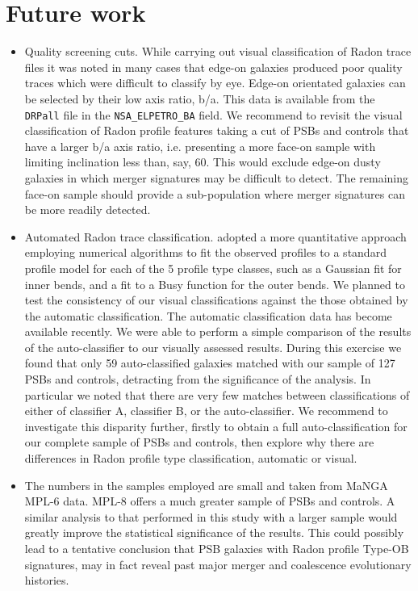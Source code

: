 \section{Future work}
\label{sec:future-work}

\begin{itemize}
    \item Quality screening cuts. While carrying out visual classification of Radon trace files it was noted in many cases that edge-on galaxies produced poor quality traces which were difficult to classify by eye. Edge-on orientated galaxies can be selected by their low axis ratio, b/a. This data is available from the \texttt{DRPall} file in the \texttt{NSA\_ELPETRO\_BA} field. We recommend to revisit the visual classification of Radon profile features taking a cut of PSBs and controls that have a larger b/a axis ratio, i.e. presenting a  more face-on sample with limiting inclination less than, say, 60\textdegree. This would exclude edge-on dusty galaxies in which merger signatures may be difficult to detect. The remaining face-on sample should provide a sub-population where merger signatures can be more readily detected.
    \item Automated Radon trace classification. \cite{2018MNRAS.480.2217S} adopted a more quantitative approach employing numerical algorithms to fit the observed profiles to a standard profile model for each of the 5 profile type classes, such as a Gaussian fit for inner bends, and a fit to a Busy function \citep{2014ascl.soft02015W} for the outer bends. We planned to test the consistency of our visual classifications against the those obtained by the automatic classification. The automatic classification data has become available recently. We were able to perform a simple comparison of the results of the auto-classifier to our visually assessed results. During this exercise we found  that only 59 auto-classified galaxies matched with our sample of 127 PSBs and controls, detracting from the significance of the analysis. In particular we noted that there are very few matches between classifications of either of classifier A, classifier B, or the auto-classifier. We recommend to investigate this disparity further, firstly to obtain a full auto-classification for our complete sample of PSBs and controls, then explore why there are differences in Radon profile type classification, automatic or visual. 
    \item The numbers in the samples employed are small and taken from MaNGA MPL-6 data. MPL-8 offers a much greater sample of PSBs and controls. A similar analysis to that performed in this study with a larger sample would greatly improve the statistical significance of the results. This could possibly lead to a tentative conclusion that PSB galaxies with Radon profile Type-OB signatures, may in fact reveal past major merger and coalescence evolutionary histories.
\end{itemize}